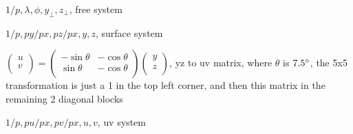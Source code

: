 $1/p, \lambda, \phi, y_{\perp}, z_{\perp}$, free system

$1/p, py/px, pz/px, y, z$, surface system

$
\begin{pmatrix}
u \\
v \\
\end{pmatrix} =
\begin{pmatrix}
-\sin{\theta} & -\cos{\theta} \\
\sin{\theta} & -\cos{\theta} \\
\end{pmatrix}
\begin{pmatrix}
y \\
z \\
\end{pmatrix}
$, yz to uv matrix, where $\theta$ is $7.5\degree$, the 5x5 transformation is just a 1 in the top left corner, and then this matrix in the remaining 2 diagonal blocks

$1/p, pu/px, pv/px, u, v$, uv system
